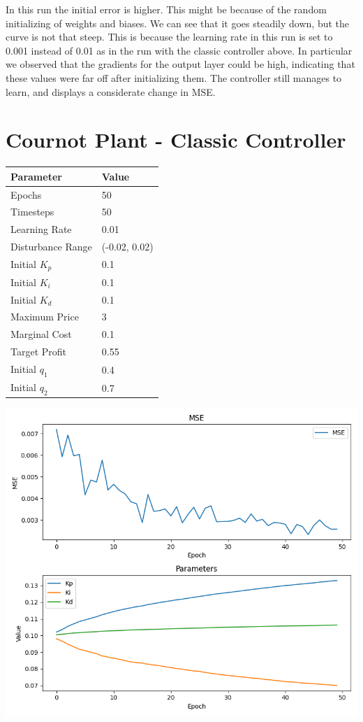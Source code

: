 \documentclass[12pt]{article}
\begin{document}
In this run the initial error is higher. This might be because of the random initializing of weights and biases.
We can see that it goes steadily down, but the curve is not that steep. This is because the learning rate in this run is set
to 0.001 instead of 0.01 as in the run with the classic controller above. In particular we observed that the gradients for the
output layer could be high, indicating that these values were far off after initializing them. The controller still manages
to learn, and displays a considerate change in MSE.

\section*{Cournot Plant - Classic Controller}

\begin{tabular}{|l|l|}
    \hline
    \textbf{Parameter}   & \textbf{Value}\\ \hline
    Epochs               & 50            \\ \hline
    Timesteps            & 50            \\ \hline
    Learning Rate        & 0.01          \\ \hline
    Disturbance Range    & (-0.02, 0.02) \\ \hline
    Initial $K_p$           & 0.1           \\ \hline
    Initial $K_i$           & 0.1           \\ \hline
    Initial $K_d$           & 0.1           \\ \hline
    Maximum Price                    & 3            \\ \hline
    Marginal Cost                    & 0.1           \\ \hline
    Target Profit & 0.55             \\ \hline
    Initial $q_1$ & 0.4             \\ \hline
    Initial $q_2$ & 0.7             \\ \hline
\end{tabular}

\begin{center}
    \includegraphics[width=0.8\linewidth]{figures/cournot-classic.png}
\end{center}
\end{document}
